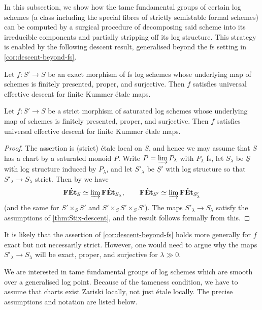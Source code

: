 In this subsection, we show how the tame fundamental groups of certain log schemes (a class including the special fibres of strictly semistable formal schemes) can be computed by a surgical procedure of decomposing said scheme into its irreducible components and partially stripping off its log structure. This strategy is enabled by the following descent result, generalised beyond the fs setting in \cref{cor:descent-beyond-fs}.

\begin{thm} \label{thm:Stix-descent}
    Let $f\colon S'\to S$ be an exact morphism of fs log schemes whose underlying map of schemes is finitely presented, proper, and surjective. Then $f$ satisfies universal effective descent for finite Kummer \'etale maps. 
\end{thm}

\begin{cor} \label{cor:descent-beyond-fs}
    Let $f\colon S'\to S$ be a strict morphism of saturated log schemes whose underlying map of schemes is finitely presented, proper, and surjective. Then $f$ satisfies universal effective descent for finite Kummer \'etale maps.
\end{cor}

\begin{proof}
The assertion is (strict) \'etale local on $S$, and hence we may assume that $S$ has a chart by a saturated monoid $P$. Write $P=\varinjlim P_\lambda$ with $P_\lambda$ fs, let $S_\lambda$ be $\underline{S}$ with log structure induced by $P_\lambda$, and let $S'_\lambda$ be $\underline{S}'$ with log structure so that $S'_\lambda\to S_\lambda$ strict. Then by \cite[Proposition~4.2.6]{AHLS-Log} we have
\[
    \mathbf{F\acute{E}t}_S \simeq \varinjlim \mathbf{F\acute{E}t}_{S_\lambda}, \qquad \mathbf{F\acute{E}t}_{S'} \simeq \varinjlim \mathbf{F\acute{E}t}_{S'_\lambda}
\]
(and the same for $S'\times_S S'$ and $S'\times_S S'\times_S S'$). The maps $S'_\lambda \to S_\lambda$ satisfy the assumptions of \cref{thm:Stix-descent}, and the result follows formally from this. 
\end{proof}

\begin{rmk}
    It is likely that the assertion of \cref{cor:descent-beyond-fs} holds more generally for $f$ exact but not necessarily strict. However, one would need to argue why the maps $S'_\lambda\to S_\lambda$ will be exact, proper, and surjective for $\lambda\gg 0$.
\end{rmk}

We are interested in tame fundamental groups of log schemes which are smooth over a generalised log point. Because of the tameness condition, we have to assume that charts exist Zariski locally, not just \'etale locally. The precise assumptions and notation are listed below.

